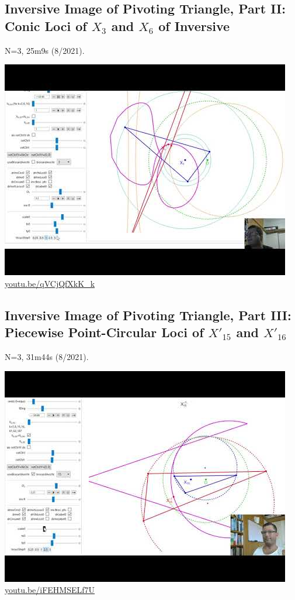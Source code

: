\documentclass[12pt]{amsart}
\begin{document}
\subsection{Inversive Image of Pivoting Triangle, Part II: Conic Loci of $X_{3}$ and $X_{6}$ of Inversive}
\label{vid:qVCjQfXkK_k}
\noindent N=3, 25m9s (8/2021). 
\begin{center}\includegraphics[width=.5\textwidth]{pics/qVCjQfXkK_k.jpg} \\ 
\href{https://youtu.be/qVCjQfXkK_k}{\url{youtu.be/qVCjQfXkK\_k}}\end{center}
% 

\subsection{Inversive Image of Pivoting Triangle, Part III: Piecewise Point-Circular Loci of $X'_{15}$ and $X'_{16}$}
\label{vid:iFEHMSELf7U}
\noindent N=3, 31m44s (8/2021). 
\begin{center}\includegraphics[width=.5\textwidth]{pics/iFEHMSELf7U.jpg} \\ 
\href{https://youtu.be/iFEHMSELf7U}{\url{youtu.be/iFEHMSELf7U}}\end{center}
% 
\end{document}
